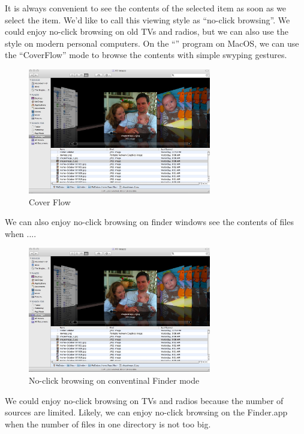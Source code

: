 \documentclass{article}
\begin{document}
It is always convenient to see the contents of the selected item
as soon as we select the item.
We'd like to call this viewing style as ``no-click browsing''.
We could enjoy no-click browsing on old TVs and radios, but we can
also use the style on modern personal computers.
On the ``'' program on MacOS, we can use the ``CoverFlow'' mode to browse
the contents with simple swyping gestures.

\begin{figure}[H]
\centerline{\includegraphics[width=80mm,bb=0 0 1080 740]{figures/902678c6770b5e043baa6f503375749f.jpg}}
\caption{Cover Flow}
\label{coverflow}
\end{figure}

We can also enjoy no-click browsing on finder windows see the contents of files when ....

\begin{figure}[H]
\centerline{\includegraphics[width=80mm,bb=0 0 1080 740]{figures/902678c6770b5e043baa6f503375749f.jpg}}
\caption{No-click browsing on conventinal Finder mode}
\label{coverflow}
\end{figure}


We could enjoy no-click browsing on TVs and radios because the number of
sources are limited.
Likely, we can enjoy no-click browsing on the Finder.app when the number of files
in one directory is not too big.
\end{document}
